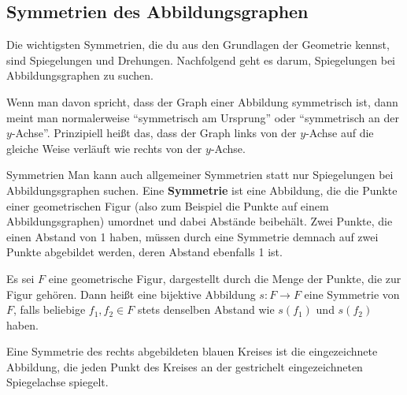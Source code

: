 \documentclass[../../main.tex]{subfiles}
\begin{document}
\subsection{Symmetrien des Abbildungsgraphen}
\label{sec:abbildungen_symmetrie}

Die wichtigsten Symmetrien, die du aus den Grundlagen der Geometrie kennst, sind Spiegelungen und Drehungen. Nachfolgend geht es darum, Spiegelungen bei Abbildungsgraphen zu suchen.

Wenn man davon spricht, dass der Graph einer Abbildung symmetrisch ist, dann meint man normalerweise \enquote{symmetrisch am Ursprung} oder \enquote{symmetrisch an der $y$-Achse}. Prinzipiell heißt das, dass der Graph links von der $y$-Achse auf die gleiche Weise verläuft wie rechts von der $y$-Achse.

\begin{advanced}{Symmetrien}
    Man kann auch allgemeiner Symmetrien statt nur Spiegelungen bei Abbildungsgraphen suchen. Eine \textbf{Symmetrie} ist eine Abbildung, die die Punkte einer geometrischen Figur (also zum Beispiel die Punkte auf einem Abbildungsgraphen) umordnet und dabei Abstände beibehält. Zwei Punkte, die einen Abstand von 1 haben, müssen durch eine Symmetrie demnach auf zwei Punkte abgebildet werden, deren Abstand ebenfalls 1 ist.
    
    \begin{definition}[Symmetrie]
        Es sei $F$ eine geometrische Figur, dargestellt durch die Menge der Punkte, die zur Figur gehören. Dann heißt eine bijektive Abbildung $s\colon F\rightarrow F$ eine Symmetrie von $F$, falls beliebige $f_1,f_2\in F$ stets denselben Abstand wie $s(f_1)$ und $s(f_2)$ haben.
    \end{definition}
    
    \begin{advexample}
        Eine Symmetrie des rechts abgebildeten blauen Kreises ist die eingezeichnete Abbildung, die jeden Punkt des Kreises an der gestrichelt eingezeichneten Spiegelachse spiegelt.
        

\end{advexample}
\end{advanced}
\end{document}
